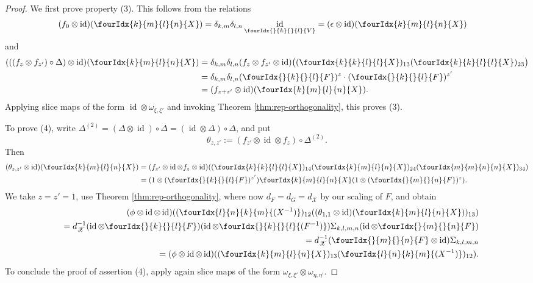 \documentclass[10pt]{article}
\DeclareMathOperator{\id}{id}
\newcommand{\Gr}[5]{\fourIdx{#2}{#4}{#3}{#5}{#1}}%
\newcommand{\Gru}[3]{\Gr{#1}{}{}{#2}{#3}}
\theoremstyle{definition}
\numberwithin{equation}{section}
\begin{document}
\begin{proof}
    We first prove property (3). This follows from the relations
    \begin{align*}
      (f_{0}  \otimes \id)(\Gr{X}{k}{l}{m}{n}) &=
      \delta_{k,m}\delta_{l,n} \id_{\Gru{V}{k}{l}} =
      (\epsilon \otimes \id)(\Gr{X}{k}{l}{m}{n})
    \end{align*}
    and
    \begin{align*}
      (((f_{z}\otimes f_{z'})\circ \Delta) \otimes
      \id)(\Gr{X}{k}{l}{m}{n}) &=  \delta_{k,m}\delta_{l,n}(f_{z} \otimes f_{z'} \otimes
      \id)\big((\Gr{X}{k}{l}{k}{l})_{13}
      (\Gr{X}{k}{l}{k}{l})_{23}\big) \\
      &=  \delta_{k,m}\delta_{l,n}(\Gru{F}{k}{l})^{z}  \cdot (\Gru{F}{k}{l})^{z'} \\
      &= (f_{z+z'} \otimes \id)(\Gr{X}{k}{l}{m}{n}).
    \end{align*}
    Applying slice maps of the form $\id
    \otimes \omega_{\xi,\xi'}$ and invoking Theorem \ref{thm:rep-orthogonality}, this proves (3).

To prove (4), write $ \Delta^{(2)} = (
    \Delta \otimes \id)\circ  \Delta = (\id \otimes 
    \Delta) \circ \Delta$, and put \[\theta_{z,z'}:=(f_{z'} \otimes \id
    \otimes f_{z})\circ  \Delta^{(2)}.\] Then
    \begin{align*}
      (\theta_{z,z'} \otimes \id)(\Gr{X}{k}{l}{m}{n}) &= (f_{z'} \otimes
      \id \otimes f_{z} \otimes
      \id)((\Gr{X}{k}{l}{k}{l})_{14}(\Gr{X}{k}{l}{m}{n})_{24}(\Gr{X}{m}{n}{m}{n})_{34})
      \\
      &= (1 \otimes (\Gru{F}{k}{l})^{z'}) \Gr{X}{k}{l}{m}{n} (1
      \otimes (\Gru{F}{m}{n})^{z}).
    \end{align*}
    We take $z=z'=1$, use Theorem \ref{thm:rep-orthogonality}, where
    now $d_F= d_G=d_{\mathscr{X}}$ by our scaling of $F$, and obtain
    \begin{eqnarray*}
     && \hspace{-2cm} (\phi \otimes \id \otimes
      \id)((\Gr{(X^{-1})}{l}{k}{n}{m})_{12}((\theta_{1,1} \otimes
      \id)(\Gr{X}{k}{l}{m}{n}))_{13})\\ && =d_{\mathscr{X}}^{-1}(\id \otimes
      \Gru{F}{k}{l}) (\id \otimes \Gru{(F^{-1})}{k}{l})
      \Sigma_{k,l,m,n} (\id \otimes
      \Gru{F}{m}{n}) \\
      &&=d_{\mathscr{X}}^{-1}(\Gru{F}{m}{n} \otimes \id) \Sigma_{k,l,m,n} \\
      &&= (\phi \otimes \id \otimes
      \id)((\Gr{X}{k}{l}{m}{n})_{13}(\Gr{(X^{-1})}{l}{k}{n}{m})_{12}).
    \end{eqnarray*}
    To conclude the proof of assertion (4), apply again slice maps of the form
    $\omega_{\xi,\xi'} \otimes \omega_{\eta,\eta'}$.


\end{proof}
\end{document}
